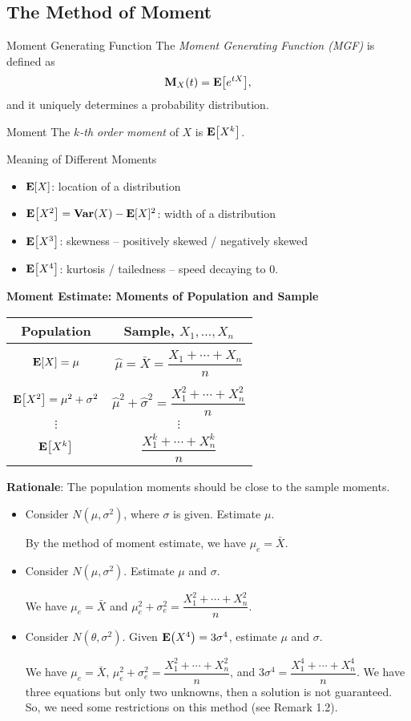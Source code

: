 \subsection{The Method of Moment}
\begin{df}{Moment Generating Function}
	The \textit{Moment Generating Function (MGF)} is defined as \[\vb{M}_X(t)=\vb{E}\qty[e^{tX}],\] and it uniquely determines a probability distribution.
\end{df}
\begin{df}{Moment}
	The \textit{$k$-th order moment} of $X$ is $\vb{E}\qty[X^k]$.	
\end{df}
\begin{eg}{Meaning of Different Moments}
	\begin{itemize}
		\item $\vb{E}[X]$: location of a distribution
		\item $\vb{E}\qty[X^2]=\vb{Var}(X)-\vb{E}[X]^2$: width of a distribution
		\item $\vb{E}\qty[X^3]$: skewness -- positively skewed / negatively skewed
		\item $\vb{E}\qty[X^4]$: kurtosis / tailedness -- speed decaying to $0$.
	\end{itemize}	
\end{eg}
\begin{eg} 
	\textbf{Moment Estimate: Moments of Population and Sample}
	\begin{center}
	\begin{tabular}{c|c}
		\textbf{Population}&\textbf{Sample, $X_1,\dots,X_n$}\\\hline\\
		$\vb{E}[X]=\mu$&$\hat\mu=\bar X=\dfrac{X_1+\cdots+X_n}{n}$\\\\
		$\vb{E}\qty[X^2]=\mu^2+\sigma^2$&$\hat\mu^2+\hat\sigma^2=\dfrac{X_1^2+\cdots+X_n^2}{n}$\\
		$\vdots$&$\vdots$\\
		$\vb{E}\qty[X^k]$&$\dfrac{X_1^k+\cdots+X_n^k}{n}$
	\end{tabular}
	\end{center}
	\textbf{Rationale}: The population moments should be close to the sample moments. 
\end{eg}
\begin{eg}
	\begin{itemize}
		\item Consider $N(\mu,\sigma^2)$, where $\sigma$ is given. Estimate $\mu$.\par By the method of moment estimate, we have $\mu_e=\bar{X}$.
		\item Consider $N(\mu,\sigma^2)$. Estimate $\mu$ and $\sigma$.\par We have $\mu_e=\bar X$ and $\mu_e^2+\sigma_e^2=\dfrac{X_1^2+\cdots+X_n^2}{n}$.
		\item Consider $N(\theta,\sigma^2)$. Given $\vb{E}\qty(X^4)=3\sigma^4$, estimate $\mu$ and $\sigma$.\par We have $\mu_e=\bar X$, $\mu_e^2+\sigma_e^2=\dfrac{X_1^2+\cdots+X_n^2}{n}$, and $3\sigma^4=\dfrac{X_1^4+\cdots+X_n^4}{n}$. We have three equations but only two unknowns, then a solution is not guaranteed. So, we need some restrictions on this method (see Remark 1.2). 
	\end{itemize}
\end{eg}
